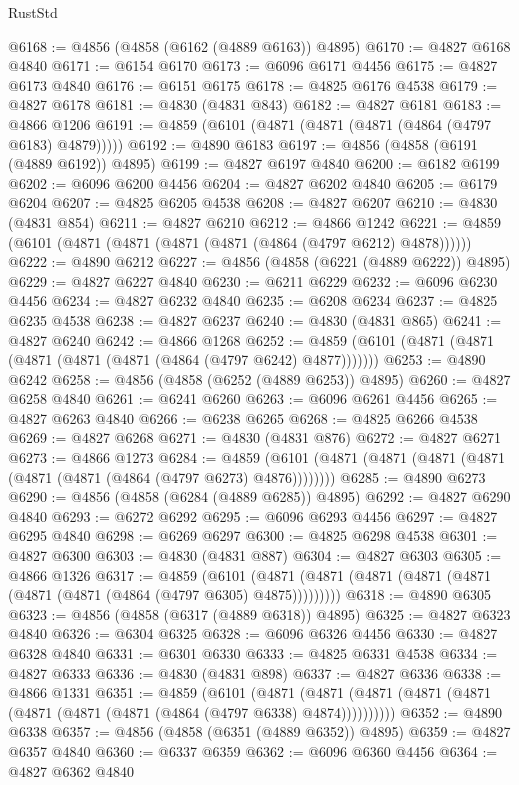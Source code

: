 \begin{lexlean}{RustStd}
\begin{coremodule}
@6168 := @4856 (@4858 (@6162 (@4889 @6163)) @4895)
@6170 := @4827 @6168 @4840
@6171 := @6154 @6170
@6173 := @6096 @6171 @4456
@6175 := @4827 @6173 @4840
@6176 := @6151 @6175
@6178 := @4825 @6176 @4538
@6179 := @4827 @6178
@6181 := @4830 (@4831 @843)
@6182 := @4827 @6181
@6183 := @4866 @1206
@6191 := @4859 (@6101 (@4871 (@4871 (@4871 (@4864 (@4797 @6183) @4879)))))
@6192 := @4890 @6183
@6197 := @4856 (@4858 (@6191 (@4889 @6192)) @4895)
@6199 := @4827 @6197 @4840
@6200 := @6182 @6199
@6202 := @6096 @6200 @4456
@6204 := @4827 @6202 @4840
@6205 := @6179 @6204
@6207 := @4825 @6205 @4538
@6208 := @4827 @6207
@6210 := @4830 (@4831 @854)
@6211 := @4827 @6210
@6212 := @4866 @1242
@6221 := @4859 (@6101 (@4871 (@4871 (@4871 (@4871 (@4864 (@4797 @6212) @4878))))))
@6222 := @4890 @6212
@6227 := @4856 (@4858 (@6221 (@4889 @6222)) @4895)
@6229 := @4827 @6227 @4840
@6230 := @6211 @6229
@6232 := @6096 @6230 @4456
@6234 := @4827 @6232 @4840
@6235 := @6208 @6234
@6237 := @4825 @6235 @4538
@6238 := @4827 @6237
@6240 := @4830 (@4831 @865)
@6241 := @4827 @6240
@6242 := @4866 @1268
@6252 := @4859 (@6101 (@4871 (@4871 (@4871 (@4871 (@4871 (@4864 (@4797 @6242) @4877)))))))
@6253 := @4890 @6242
@6258 := @4856 (@4858 (@6252 (@4889 @6253)) @4895)
@6260 := @4827 @6258 @4840
@6261 := @6241 @6260
@6263 := @6096 @6261 @4456
@6265 := @4827 @6263 @4840
@6266 := @6238 @6265
@6268 := @4825 @6266 @4538
@6269 := @4827 @6268
@6271 := @4830 (@4831 @876)
@6272 := @4827 @6271
@6273 := @4866 @1273
@6284 := @4859 (@6101 (@4871 (@4871 (@4871 (@4871 (@4871 (@4871 (@4864 (@4797 @6273) @4876))))))))
@6285 := @4890 @6273
@6290 := @4856 (@4858 (@6284 (@4889 @6285)) @4895)
@6292 := @4827 @6290 @4840
@6293 := @6272 @6292
@6295 := @6096 @6293 @4456
@6297 := @4827 @6295 @4840
@6298 := @6269 @6297
@6300 := @4825 @6298 @4538
@6301 := @4827 @6300
@6303 := @4830 (@4831 @887)
@6304 := @4827 @6303
@6305 := @4866 @1326
@6317 := @4859
    (@6101 (@4871 (@4871 (@4871 (@4871 (@4871 (@4871 (@4871 (@4864 (@4797 @6305) @4875)))))))))
@6318 := @4890 @6305
@6323 := @4856 (@4858 (@6317 (@4889 @6318)) @4895)
@6325 := @4827 @6323 @4840
@6326 := @6304 @6325
@6328 := @6096 @6326 @4456
@6330 := @4827 @6328 @4840
@6331 := @6301 @6330
@6333 := @4825 @6331 @4538
@6334 := @4827 @6333
@6336 := @4830 (@4831 @898)
@6337 := @4827 @6336
@6338 := @4866 @1331
@6351 := @4859
    (@6101
      (@4871 (@4871 (@4871 (@4871 (@4871 (@4871 (@4871 (@4871 (@4864 (@4797 @6338) @4874))))))))))
@6352 := @4890 @6338
@6357 := @4856 (@4858 (@6351 (@4889 @6352)) @4895)
@6359 := @4827 @6357 @4840
@6360 := @6337 @6359
@6362 := @6096 @6360 @4456
@6364 := @4827 @6362 @4840

\end{coremodule}
\end{lexlean}
